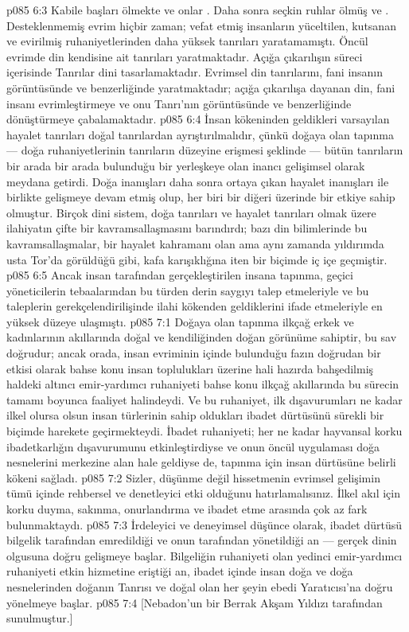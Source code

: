 \vs p085 6:3 Kabile başları ölmekte ve onlar . Daha sonra seçkin ruhlar ölmüş ve . Desteklenmemiş evrim hiçbir zaman; vefat etmiş insanların yüceltilen, kutsanan ve evirilmiş ruhaniyetlerinden daha yüksek tanrıları yaratamamıştı. Öncül evrimde din kendisine ait tanrıları yaratmaktadır. Açığa çıkarılışın süreci içerisinde Tanrılar dini tasarlamaktadır. Evrimsel din tanrılarını, fani insanın görüntüsünde ve benzerliğinde yaratmaktadır; açığa çıkarılışa dayanan din, fani insanı evrimleştirmeye ve onu Tanrı’nın görüntüsünde ve benzerliğinde dönüştürmeye çabalamaktadır.
\vs p085 6:4 İnsan kökeninden geldikleri varsayılan hayalet tanrıları doğal tanrılardan ayrıştırılmalıdır, çünkü doğaya olan tapınma --- doğa ruhaniyetlerinin tanrıların düzeyine erişmesi şeklinde --- bütün tanrıların bir arada bir arada bulunduğu bir yerleşkeye olan inancı gelişimsel olarak meydana getirdi. Doğa inanışları daha sonra ortaya çıkan hayalet inanışları ile birlikte gelişmeye devam etmiş olup, her biri bir diğeri üzerinde bir etkiye sahip olmuştur. Birçok dini sistem, doğa tanrıları ve hayalet tanrıları olmak üzere ilahiyatın çifte bir kavramsallaşmasını barındırdı; bazı din bilimlerinde bu kavramsallaşmalar, bir hayalet kahramanı olan ama aynı zamanda yıldırımda usta Tor’da görüldüğü gibi, kafa karışıklığına iten bir biçimde iç içe geçmiştir.
\vs p085 6:5 Ancak insan tarafından gerçekleştirilen insana tapınma, geçici yöneticilerin tebaalarından bu türden derin saygıyı talep etmeleriyle ve bu taleplerin gerekçelendirilişinde ilahi kökenden geldiklerini ifade etmeleriyle en yüksek düzeye ulaşmıştı.
\vs p085 7:1 Doğaya olan tapınma ilkçağ erkek ve kadınlarının akıllarında doğal ve kendiliğinden doğan görünüme sahiptir, bu sav doğrudur; ancak orada, insan evriminin içinde bulunduğu fazın doğrudan bir etkisi olarak bahse konu insan toplulukları üzerine hali hazırda bahşedilmiş haldeki altıncı emir\hyp{}yardımcı ruhaniyeti bahse konu ilkçağ akıllarında bu sürecin tamamı boyunca faaliyet halindeydi. Ve bu ruhaniyet, ilk dışavurumları ne kadar ilkel olursa olsun insan türlerinin sahip oldukları ibadet dürtüsünü sürekli bir biçimde harekete geçirmekteydi. İbadet ruhaniyeti; her ne kadar hayvansal korku ibadetkarlığın dışavurumunu etkinleştirdiyse ve onun öncül uygulaması doğa nesnelerini merkezine alan hale geldiyse de, tapınma için insan dürtüsüne belirli kökeni sağladı.
\vs p085 7:2 Sizler, düşünme değil hissetmenin evrimsel gelişimin tümü içinde rehbersel ve denetleyici etki olduğunu hatırlamalısınız. İlkel akıl için korku duyma, sakınma, onurlandırma ve ibadet etme arasında çok az fark bulunmaktaydı.
\vs p085 7:3 İrdeleyici ve deneyimsel düşünce olarak, ibadet dürtüsü bilgelik tarafından emredildiği ve onun tarafından yönetildiği an --- gerçek dinin olgusuna doğru gelişmeye başlar. Bilgeliğin ruhaniyeti olan yedinci emir\hyp{}yardımcı ruhaniyeti etkin hizmetine eriştiği an, ibadet içinde insan doğa ve doğa nesnelerinden doğanın Tanrısı ve doğal olan her şeyin ebedi Yaratıcısı’na doğru yönelmeye başlar.
\vs p085 7:4 [Nebadon’un bir Berrak Akşam Yıldızı tarafından sunulmuştur.]
